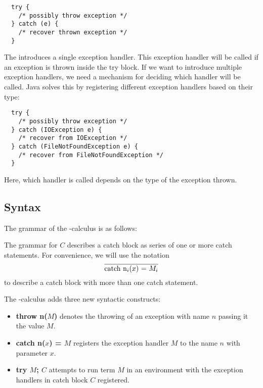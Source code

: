 \begin{Verbatim}
  try {
    /* possibly throw exception */
  } catch (e) {
    /* recover thrown exception */ 
  }
\end{Verbatim}

The  introduces a single exception handler.
This exception handler will be called if an exception is thrown inside the try block.
If we want to introduce multiple exception handlers,
we need a mechanism for deciding which handler will be called.
Java solves this by registering different exception handlers based on their type:

\begin{Verbatim}
  try {
    /* possibly throw exception */
  } catch (IOException e) {
    /* recover from IOException */  
  } catch (FileNotFoundException e) {
    /* recover from FileNotFoundException */ 
  }
\end{Verbatim}

Here, which handler is called depends on the type of the exception thrown.

\subsection{Syntax}

The grammar of the \ltry-calculus is as follows:

The grammar for $C$ describes a catch block as series of one or more catch statements. 
For convenience, we will use the notation 
\[
  \overline{\text{catch n$_i$($x$) = $M_i$}}
\]
to describe a catch block with more than one catch statement. 

The \ltry-calculus adds three new syntactic constructs:
\begin{itemize}
\item \textbf{throw n($M$)} denotes the throwing of an exception with name $n$ passing it the value $M$.
\item \textbf{catch n($x$) = $M$} registers the exception handler $M$ to the name $n$ with parameter $x$.
\item \textbf{try $M$; $C$} attempts to run term $M$ in an environment with the exception handlers in catch block $C$ registered.
\end{itemize}


